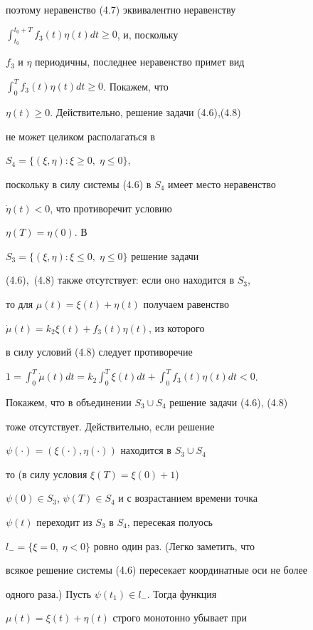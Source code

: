 поэтому неравенство (4.7) эквивалентно неравенству


$\int_{t_0}^{t_0+T}f_3(t)\eta(t) dt \ge 0$, и, поскольку


$f_3$ и $\eta$ периодичны, последнее неравенство примет вид


$\int_{0}^{T}f_3(t)\eta(t) dt \ge 0$. Покажем, что


$\eta(t) \ge 0.$ Действительно, решение задачи (4.6),(4.8)


не может целиком располагаться в


$S_4=\{(\xi,\eta) : \xi \ge 0,\; \eta \le 0\}$,


поскольку в силу системы (4.6) в $S_4$ имеет место неравенство


$\Dot \eta (t) < 0$, что противоречит условию


$\eta (T)=\eta (0)$. В


$S_3=\{(\xi,\eta) : \xi \le 0,\; \eta \le 0\}$ решение задачи


(4.6),~(4.8) также отсутствует: если оно находится в $S_3$,


то для $\mu(t)=\xi (t) + \eta (t)$ получаем равенство


$\Dot \mu(t) = k_2\xi(t) + f_3(t)\eta (t)$, из которого


в силу условий (4.8) следует противоречие


$1=\int_0^T\Dot\mu(t)dt=k_2\int_0^T\xi(t)dt + \int_0^Tf_3(t)\eta (t)dt<0$.





Покажем, что в объединении $S_3\cup S_4$ решение задачи (4.6), (4.8)


тоже отсутствует. Действительно, если решение


$\psi (\cdot)=(\xi(\cdot),\eta(\cdot))$ находится в $S_3\cup S_4$


то (в силу условия $\xi(T)=\xi(0) + 1$)\;\;


$\psi (0)\in S_3$, $\psi(T)\in S_4$ и с возрастанием времени точка


$\psi(t)$ переходит из $S_3$ в $S_4$, пересекая полуось


$l_{-}=\{\xi = 0,\ \eta < 0\}$ ровно один раз. (Легко заметить, что


всякое решение системы (4.6) пересекает координатные оси не более


одного раза.) Пусть $\psi(t_1)\in l_{-}$. Тогда функция


$\mu(t)=\xi(t) + \eta(t)$ строго монотонно убывает при


